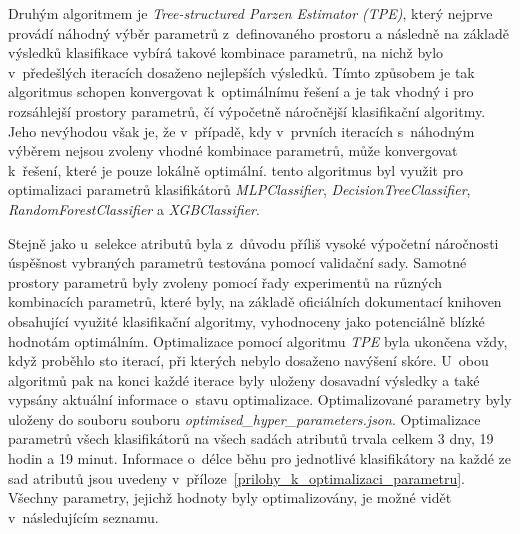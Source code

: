 Druhým algoritmem je \textit{Tree-structured Parzen Estimator (TPE)}, který nejprve provádí náhodný výběr parametrů z~definovaného prostoru a následně na základě výsledků klasifikace vybírá takové kombinace parametrů, na nichž bylo v~předešlých iteracích dosaženo nejlepších výsledků. Tímto způsobem je tak algoritmus schopen konvergovat k~optimálnímu řešení a je tak vhodný i pro rozsáhlejší prostory parametrů, čí výpočetně náročnější klasifikační algoritmy. Jeho nevýhodou však je, že v~případě, kdy v~prvních iteracích s~náhodným výběrem nejsou zvoleny vhodné kombinace parametrů, může konvergovat k~řešení, které je pouze lokálně optimální. tento algoritmus byl využit pro optimalizaci parametrů klasifikátorů \textit{MLPClassifier}, \textit{DecisionTreeClassifier}, \textit{RandomForestClassifier} a \textit{XGBClassifier}.

Stejně jako u~selekce atributů byla z~důvodu příliš vysoké výpočetní náročnosti úspěšnost vybraných parametrů testována pomocí validační sady. Samotné prostory parametrů byly zvoleny pomocí řady experimentů na různých kombinacích parametrů, které byly, na základě oficiálních dokumentací knihoven obsahující využité klasifikační algoritmy, vyhodnoceny jako potenciálně blízké hodnotám optimálním. Optimalizace pomocí algoritmu \textit{TPE} byla ukončena vždy, když proběhlo sto iterací, při kterých nebylo dosaženo navýšení skóre. U~obou algoritmů pak na konci každé iterace byly uloženy dosavadní výsledky a také vypsány aktuální informace o~stavu optimalizace. Optimalizované parametry byly uloženy do souboru souboru \textit{optimised\_hyper\_parameters.json}. Optimalizace parametrů všech klasifikátorů na všech sadách atributů trvala celkem 3 dny, 19 hodin a 19 minut.  Informace o~délce běhu pro jednotlivé klasifikátory na každé ze sad atributů jsou uvedeny v~příloze~\ref{prilohy_k_optimalizaci_parametru}. Všechny parametry, jejichž hodnoty byly optimalizovány, je možné vidět v~následujícím seznamu.

